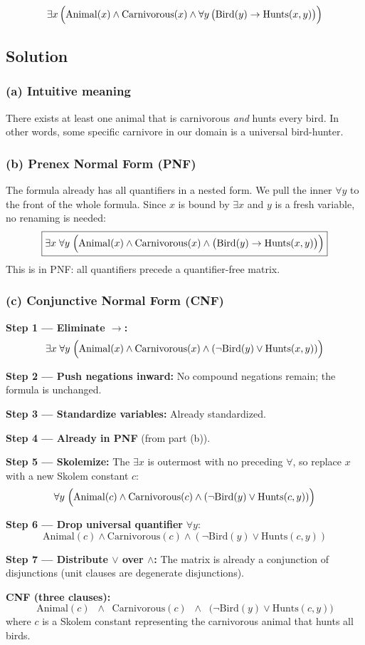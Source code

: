 \documentclass[11pt,a4paper]{article}
\newenvironment{solution}{%
	\begin{tcolorbox}[
		breakable,
		colback=green!4,
		colframe=green!50!black,
		fonttitle=\bfseries,
		title={ Solution},
		left=6pt, right=6pt, top=4pt, bottom=4pt
		]%
	}{%
	\end{tcolorbox}%
}
\newcommand{\fall}[1]{\forall #1\,}
\newcommand{\fex}[1]{\exists #1\,}
\begin{document}
\[
\fex{x}\Bigl(\mathrm{Animal}(x) \land \mathrm{Carnivorous}(x)
\land \fall{y}\bigl(\mathrm{Bird}(y) \to \mathrm{Hunts}(x,y)\bigr)\Bigr)
\]
\subsection*{Solution}
\begin{solution}
\subsubsection*{(a) Intuitive meaning}
There exists at least one animal that is carnivorous \emph{and} hunts every bird. In other words, some specific carnivore in our domain is a universal bird-hunter.

\subsubsection*{(b) Prenex Normal Form (PNF)}
The formula already has all quantifiers in a nested form. We pull the inner $\forall y$ to the front of the whole formula. Since $x$ is bound by $\exists x$ and $y$ is a fresh variable, no renaming is needed:
\[
\boxed{\exists x\;\forall y\;\Bigl(\mathrm{Animal}(x) \land \mathrm{Carnivorous}(x) \land \bigl(\mathrm{Bird}(y) \to \mathrm{Hunts}(x,y)\bigr)\Bigr)}
\]
This is in PNF: all quantifiers precede a quantifier-free matrix.

\subsubsection*{(c) Conjunctive Normal Form (CNF)}

\textbf{Step 1 — Eliminate $\to$:}
\[
\exists x\;\forall y\;\Bigl(\mathrm{Animal}(x) \land \mathrm{Carnivorous}(x) \land (\neg\mathrm{Bird}(y) \lor \mathrm{Hunts}(x,y))\Bigr)
\]

\textbf{Step 2 — Push negations inward:} No compound negations remain; the formula is unchanged.

\textbf{Step 3 — Standardize variables:} Already standardized.

\textbf{Step 4 — Already in PNF} (from part (b)).

\textbf{Step 5 — Skolemize:} The $\exists x$ is outermost with no preceding $\forall$, so replace $x$ with a new Skolem constant $c$:
\[
\forall y\;\Bigl(\mathrm{Animal}(c) \land \mathrm{Carnivorous}(c) \land (\neg\mathrm{Bird}(y) \lor \mathrm{Hunts}(c,y))\Bigr)
\]

\textbf{Step 6 — Drop universal quantifier} $\forall y$:
\[
\mathrm{Animal}(c) \land \mathrm{Carnivorous}(c) \land (\neg\mathrm{Bird}(y) \lor \mathrm{Hunts}(c,y))
\]

\textbf{Step 7 — Distribute $\lor$ over $\land$:} The matrix is already a conjunction of disjunctions (unit clauses are degenerate disjunctions).

\medskip
\textbf{CNF (three clauses):}
\[
\boxed{\mathrm{Animal}(c) \;\;\land\;\; \mathrm{Carnivorous}(c) \;\;\land\;\; \bigl(\neg\mathrm{Bird}(y) \lor \mathrm{Hunts}(c,y)\bigr)}
\]
where $c$ is a Skolem constant representing the carnivorous animal that hunts all birds.
\end{solution}

\end{document}
